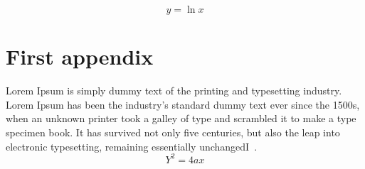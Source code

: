 \documentclass[10pt, a4paper]{article}
\begin{document}
\begin{equation}
y = \ln x
\end{equation}  
  
\appendix
\section{First appendix}
Lorem Ipsum is simply dummy text of the printing and typesetting industry. Lorem Ipsum has been the industry's standard dummy text ever since the 1500s, when an unknown printer took a galley of type and scrambled it to make a type specimen book. It has survived not only five centuries, but also the leap into electronic typesetting, remaining essentially unchangedI~\citep{Davies1998}.
\begin{equation}
Y^2 = 4ax
\end{equation}



\end{document}
